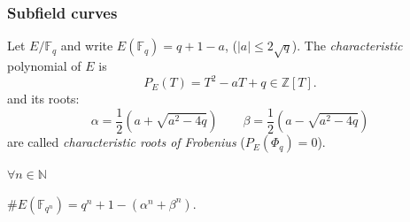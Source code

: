 \documentclass[10pt,handout]{beamer} %
\newcommand{\Z}{\mathbb Z}
\newcommand{\N}{\mathbb N}
\newcommand{\F}{\mathbb F}
\theoremstyle{definition}
\begin{document}
% 
% 

\begin{frame}\frametitle{Subfield curves}

\begin{definition}
Let $E/\F_q$ and write $E(\F_q)=q+1-a$, ($|a|\le2\sqrt{q}$). The \emph{characteristic}
polynomial of $E$ is
$$P_E(T)=T^2-aT+q\in\Z[T].$$
and its roots:
$$\alpha=\frac12\left(a+\sqrt{a^2-4q}\right)\qquad\beta=\frac12\left(a-\sqrt{a^2-4q}\right)$$
are called \emph{characteristic roots of Frobenius} ($P_E(\Phi_q)=0$).
\end{definition}

\begin{theorem} $\forall n\in\N$
\centerline{$\#E(\F_{q^n})=q^n+1-(\alpha^n+\beta^n).$}
\end{theorem}
\end{frame}
\end{document}
